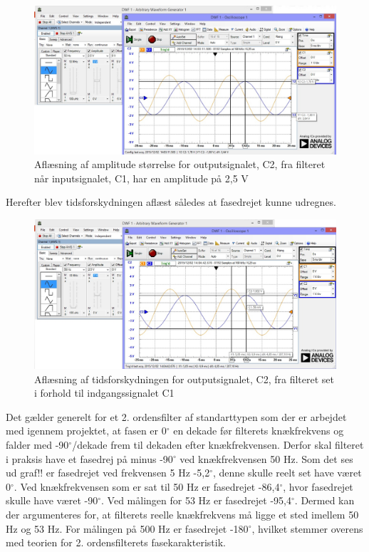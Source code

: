 \begin{figure}[H]
	\centering
	\includegraphics[width=1\textwidth]{Figurer/Hardware/AnalogScreenFilterAmp}
	\caption{Aflæsning af amplitude størrelse for outputsignalet, C2, fra filteret når inputsignalet, C1, har en amplitude på 2,5 V}
	\label{fig:FilterAmplitude}
\end{figure}

Herefter blev tidsforskydningen aflæst således at fasedrejet kunne udregnes.

\begin{figure}[H]
	\centering
	\includegraphics[width=1\textwidth]{Figurer/Hardware/AnalogScreenFilter}
	\caption{Aflæsning af tidsforskydningen for outputsignalet, C2, fra filteret set i forhold til indgangssignalet C1}
	\label{fig:FilterTidsforskydning}
\end{figure}

Det gælder generelt for et 2. ordensfilter af standarttypen som der er arbejdet med igennem projektet, at fasen er 0$^{\circ}$ en dekade før filterets knækfrekvens og falder med -90$^{\circ}$/dekade frem til dekaden efter knækfrekvensen. Derfor skal filteret i praksis have et fasedrej på minus -90$^{\circ}$ ved knækfrekvensen 50 Hz. Som det ses ud graf!! er fasedrejet ved frekvensen 5 Hz -5,2$^{\circ}$, denne skulle reelt set have været 0$^{\circ}$. 
Ved knækfrekvensen som er sat til 50 Hz er fasedrejet -86,4$^{\circ}$, hvor fasedrejet skulle have været -90$^{\circ}$. Ved målingen for 53 Hz er fasedrejet -95,4$^{\circ}$. Dermed kan der argumenteres for, at filterets reelle knækfrekvens må ligge et sted imellem 50 Hz og 53 Hz. 
For målingen på 500 Hz er fasedrejet -180$^{\circ}$, hvilket stemmer overens med teorien for 2. ordensfilterets fasekarakteristik.

